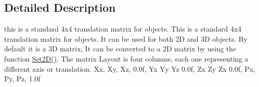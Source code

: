 \subsection{Detailed Description}
this is a standard 4x4 translation matrix for objects. This is a standard 4x4 translation matrix for objects. It can be used for both 2D and 3D objects. By default it is a 3D matrix, It can be converted to a 2D matrix by using the function \hyperlink{classc_matrix4_ad24236403317622459c3309938be9d21}{Set2D()}. The matrix Layout is four columns, each one representing a different axis or translation. Xx, Xy, Xz, 0.0f, Yx Yy Yz 0.0f, Zx Zy Zx 0.0f, Px, Py, Pz, 1.0f 